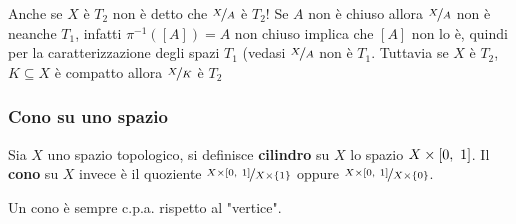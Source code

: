 \begin{attention}
	Anche se $X$ è $T_2$ non è detto che $\nicefrac{X}{A}$ è $T_2$!\newline
	Se $A$ non è chiuso allora $\nicefrac{X}{A}$ non è neanche $T_1$, infatti $\pi^{-1}([A])=A$ non chiuso implica che $[A]$ non lo è, quindi per la caratterizzazione degli spazi $T_1$ (vedasi %
	$\nicefrac{X}{A}$ non è $T_1$.\newline 
	Tuttavia se $X$ è $T_2$, $K\subseteq X$ è compatto allora $\nicefrac{X}{K}$ è $T_2$
\end{attention}

\subsubsection{Cono su uno spazio}
\begin{define}
	Sia $X$ uno spazio topologico, si definisce \textbf{cilindro} su $X$ lo spazio $X\times \left[0,\ 1\right]$.\newline 
	Il \textbf{cono} su $X$ invece è il quoziente $\displaystyle \nicefrac{X\times\left[0,\ 1\right]}{X\times\{1\}}$ oppure $\displaystyle \nicefrac{X\times\left[0,\ 1\right]}{X\times\{0\}}$.
\end{define}

\begin{observe}
	Un cono è sempre c.p.a. rispetto al "vertice".
\end{observe}